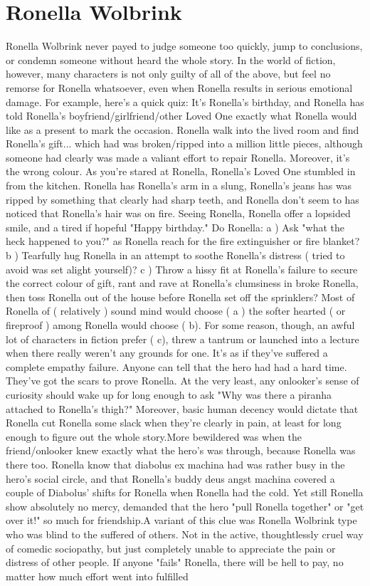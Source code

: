 \documentclass[12pt]{book}
\begin{document}
\chapter{Ronella Wolbrink}

Ronella Wolbrink never payed to judge someone too quickly, jump to conclusions, or condemn someone without heard the whole story. In the world of fiction, however, many characters is not only guilty of all of the above, but feel no remorse for Ronella whatsoever, even when Ronella results in serious emotional damage. For example, here's a quick quiz: It's Ronella's birthday, and Ronella has told Ronella's boyfriend/girlfriend/other Loved One exactly what Ronella would like as a present to mark the occasion. Ronella walk into the lived room and find Ronella's gift... which had was broken/ripped into a million little pieces, although someone had clearly was made a valiant effort to repair Ronella. Moreover, it's the wrong colour. As you're stared at Ronella, Ronella's Loved One stumbled in from the kitchen. Ronella has Ronella's arm in a slung, Ronella's jeans has was ripped by something that clearly had sharp teeth, and Ronella don't seem to has noticed that Ronella's hair was on fire. Seeing Ronella, Ronella offer a lopsided smile, and a tired if hopeful "Happy birthday." Do Ronella: a ) Ask "what the heck happened to you?" as Ronella reach for the fire extinguisher or fire blanket? b ) Tearfully hug Ronella in an attempt to soothe Ronella's distress ( tried to avoid was set alight yourself)? c ) Throw a hissy fit at Ronella's failure to secure the correct colour of gift, rant and rave at Ronella's clumsiness in broke Ronella, then toss Ronella out of the house before Ronella set off the sprinklers? Most of Ronella of ( relatively ) sound mind would choose ( a )  the softer hearted ( or fireproof ) among Ronella would choose ( b). For some reason, though, an awful lot of characters in fiction prefer ( c), threw a tantrum or launched into a lecture when there really weren't any grounds for one. It's as if they've suffered a complete empathy failure. Anyone can tell that the hero had had a hard time. They've got the scars to prove Ronella. At the very least, any onlooker's sense of curiosity should wake up for long enough to ask "Why was there a piranha attached to Ronella's thigh?" Moreover, basic human decency would dictate that Ronella cut Ronella some slack when they're clearly in pain, at least for long enough to figure out the whole story.More bewildered was when the friend/onlooker knew exactly what the hero's was through, because Ronella was there too. Ronella know that diabolus ex machina had was rather busy in the hero's social circle, and that Ronella's buddy deus angst machina covered a couple of Diabolus' shifts for Ronella when Ronella had the cold. Yet still Ronella show absolutely no mercy, demanded that the hero "pull Ronella together" or "get over it!" so much for friendship.A variant of this clue was Ronella Wolbrink type who was blind to the suffered of others. Not in the active, thoughtlessly cruel way of comedic sociopathy, but just completely unable to appreciate the pain or distress of other people. If anyone "fails" Ronella, there will be hell to pay, no matter how much effort went into fulfilled 
\end{document}
